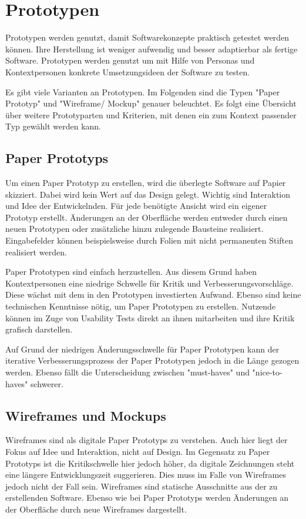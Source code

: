 \section{Prototypen}\label{sec:prototypen}

Prototypen werden genutzt, damit Softwarekonzepte praktisch getestet werden können.
Ihre Herstellung ist weniger aufwendig und besser adaptierbar als fertige Software.
Prototypen werden genutzt um mit Hilfe von Personas und Kontextpersonen konkrete Umsetzungsideen der Software zu testen.

Es gibt viele Varianten an Prototypen.
Im Folgenden sind die Typen "Paper Prototyp" und "Wireframe/ Mockup" genauer beleuchtet.
Es folgt eine Übersicht über weitere Prototyparten und Kriterien, mit denen ein zum Kontext passender Typ gewählt werden kann.

\subsection{Paper Prototyps}

Um einen Paper Prototyp zu erstellen, wird die überlegte Software auf Papier skizziert.
Dabei wird kein Wert auf das Design gelegt.
Wichtig sind Interaktion und Idee der Entwickelnden.
Für jede benötigte Ansicht wird ein eigener Prototyp erstellt.
Änderungen an der Oberfläche werden entweder durch einen neuen Prototypen oder zusätzliche hinzu zulegende Bausteine realisiert.
Eingabefelder können beispielsweise durch Folien mit nicht permanenten Stiften realisiert werden.

Paper Prototypen sind einfach herzustellen.
Aus diesem Grund haben Kontextpersonen eine niedrige Schwelle für Kritik und Verbesserungsvorschläge.
Diese wächst mit dem in den Prototypen investierten Aufwand.
Ebenso sind keine technischen Kenntnisse nötig, um Paper Prototypen zu erstellen.
Nutzende können im Zuge von Usability Tests direkt an ihnen mitarbeiten und ihre Kritik grafisch darstellen.

Auf Grund der niedrigen Änderungsschwelle für Paper Prototypen kann der iterative Verbesserungsprozess der Paper Prototypen jedoch in die Länge gezogen werden.
Ebenso fällt die Unterscheidung zwischen "must-haves" und "nice-to-haves" schwerer.

\subsection{Wireframes und Mockups}

Wireframes sind als digitale Paper Prototyps zu verstehen. Auch hier liegt der Fokus auf Idee und Interaktion, nicht auf Design.
Im Gegensatz zu Paper Prototyps ist die Kritikschwelle hier jedoch höher, da digitale Zeichnungen steht eine längere Entwicklungszeit suggerieren.
Dies muss im Falle von Wireframes jedoch nicht der Fall sein.
Wireframes sind statische Ausschnitte aus der zu erstellenden Software.
Ebenso wie bei Paper Prototyps werden Änderungen an der Oberfläche durch neue Wireframes dargestellt.


